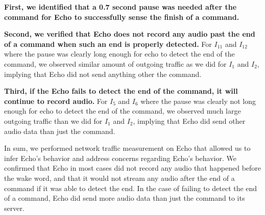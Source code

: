 \textbf{First, we identified that a 0.7 second pause was needed after the command for Echo to successfully sense the finish of a command.}  

\textbf{Second, we verified that Echo does not record any audio past the end of a command when such an end is properly detected.} For $I_{11}$ and $I_{12}$ where the pause was clearly long enough for echo to detect the end of the command, we observed similar amount of outgoing traffic as we did for $I_{1}$ and $I_{2}$, implying that Echo did not send anything other the command.

\textbf{Third, if the Echo fails to detect the end of the command, it will continue to record audio.} For $I_{5}$ and $I_{6}$ where the pause was clearly not long enough for echo to detect the end of the command, we observed much large outgoing traffic than we did for $I_{1}$ and $I_{2}$, implying that Echo did send other audio data than just the command.

In sum, we performed network traffic measurement on Echo that allowed us to infer Echo's behavior and address concerns regarding Echo's behavior. We confirmed that Echo in most cases did not record any audio that happened before the wake word, and that it would not stream any audio after the end of a command if it was able to detect the end. In the case of failing to detect the end of a command, Echo did send more audio data than just the command to its server.
